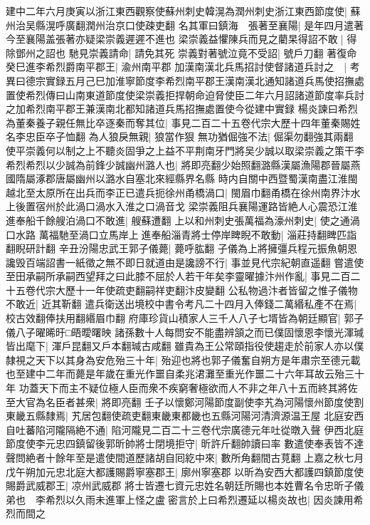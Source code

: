 建中二年六月庚寅以浙江東西觀察使蘇州刺史韓滉為潤州刺史浙江東西節度使|{
	蘇州治吴縣滉呼廣翻潤州治京口使疎吏翻}
名其軍曰鎮海　張著至襄陽|{
	是年四月遣著今至襄陽盖張著亦疑梁崇義遲遲不進也}
梁崇義益懼陳兵而見之藺杲得詔不敢|{
	得除鄧州之詔也}
馳見崇義請命|{
	請免其死}
崇義對著號泣竟不受詔|{
	號戶刀翻}
著復命癸巳進李希烈爵南平郡王|{
	渝州南平郡}
加漢南漢北兵馬招討使督諸道兵討之　|{
	考異曰德宗實録五月己巳加淮寧節度李希烈南平郡王漢南漢北通知諸道兵馬使招撫處置使希烈傳曰山南東道節度使梁崇義拒捍朝命迫脅使臣二年六月詔諸道節度率兵討之加希烈南平郡王兼漢南北都知諸道兵馬招撫處置使今從建中實録}
楊炎諫曰希烈為董秦養子親任無比卒逐秦而奪其位|{
	事見二百二十五卷代宗大歷十四年董秦賜姓名李忠臣卒子恤翻}
為人狼戾無親|{
	狼當作狠}
無功猶倔強不法|{
	倔渠勿翻強其兩翻}
使平崇義何以制之上不聽炎固爭之上益不平荆南牙門將吴少誠以取梁崇義之策干李希烈希烈以少誠為前鋒少誠幽州潞人也|{
	將即亮翻少始照翻潞縣漢屬漁陽郡晉屬燕國隋屬涿郡唐屬幽州以潞水自塞北來經縣界名縣}
時内自關中西暨蜀漢南盡江淮閩越北至太原所在出兵而李正已遣兵扼徐州甬橋渦口|{
	閩眉巾翻甬橋在徐州南界汴水上後置宿州於此渦口渦水入淮之口渦音戈}
梁崇義阻兵襄陽運路皆絶人心震恐江淮進奉船千餘艘泊渦口不敢進|{
	艘蘇遭翻}
上以和州刺史張萬福為濠州刺史|{
	使之通渦口水路}
萬福馳至渦口立馬岸上進奉船淄青將士停岸睥睨不敢動|{
	淄莊持翻睥匹詣翻睨研計翻}
辛丑汾陽忠武王郭子儀薨|{
	薨呼肱翻}
子儀為上將擁彊兵程元振魚朝恩讒毁百端詔書一紙徵之無不即日就道由是讒謗不行|{
	事並見代宗紀朝直遥翻}
嘗遣使至田承嗣所承嗣西望拜之曰此膝不屈於人若干年矣李靈曜據汴州作亂|{
	事見二百二十五卷代宗大歷十一年使疏吏翻嗣祥吏翻汴皮變翻}
公私物過汴者皆留之惟子儀物不敢近|{
	近其靳翻}
遣兵衛送出境校中書令考凡二十四月入俸錢二萬緡私產不在焉|{
	校古效翻俸扶用翻緡眉巾翻}
府庫珍貨山積家人三千人八子七壻皆為朝廷顯官|{
	郭子儀八子曜晞旴□晤曖曙映}
諸孫數十人每問安不能盡辨頷之而已僕固懷恩李懷光渾瑊皆出麾下|{
	渾戶昆翻又戶本翻瑊古咸翻}
雖貴為王公常頤指役使趨走於前家人亦以僕隸視之天下以其身為安危殆三十年|{
	殆迎也將也郭子儀奮自朔方是年肅宗至德元載也至建中二年而薨是年歲在重光作噩自柔兆涒灘至重光作噩二十六年耳故云殆三十年}
功蓋天下而主不疑位極人臣而衆不疾窮奢極欲而人不非之年八十五而終其將佐至大官為名臣者甚衆|{
	將即亮翻}
壬子以懷鄭河陽節度副使李艽為河陽懷州節度使割東畿五縣隸焉|{
	艽居包翻使疏吏翻東畿東都畿也五縣河陽河清濟源温王屋}
北庭安西自吐蕃陷河隴隔絶不通|{
	陷河隴見二百二十三卷代宗廣德元年吐從暾入聲}
伊西北庭節度使李元忠四鎮留後郭昕帥將士閉境拒守|{
	昕許斤翻帥讀曰率}
數遣使奉表皆不達聲問絶者十餘年至是遣使間道歷諸胡自囘紇中來|{
	數所角翻間古莧翻}
上嘉之秋七月戊午朔加元忠北庭大都護賜爵寧塞郡王|{
	廓州寧塞郡}
以昕為安西大都護四鎮節度使賜爵武威郡王|{
	凉州武威郡}
將士皆遷七資元忠姓名朝廷所賜也本姓曹名令忠昕子儀弟也　李希烈以久雨未進軍上怪之盧密言於上曰希烈遷延以楊炎故也|{
	因炎諫用希烈而間之}
